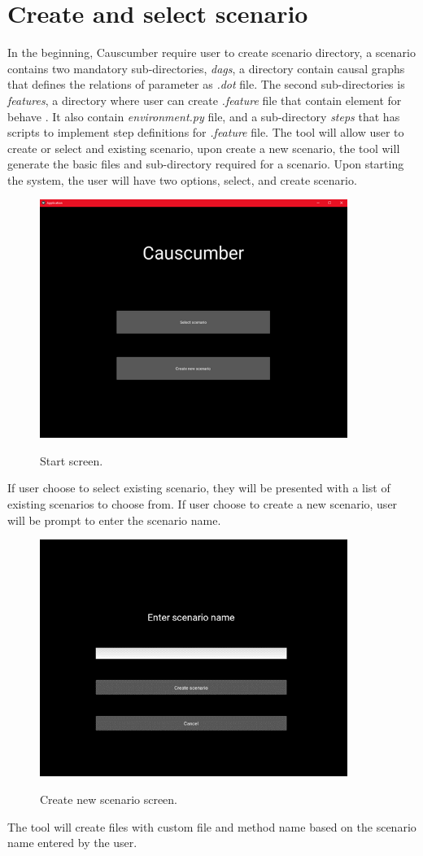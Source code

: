 \section{Create and select scenario}
In the beginning, Causcumber require user to create scenario directory, a scenario contains two mandatory sub-directories, \textsl{dags}, a directory contain causal graphs that defines the relations of parameter as \textsl{.dot} file. The second sub-directories is \textsl{features}, a directory where user can create \textsl{.feature} file that contain element for behave \cite{Reference21}. It also contain \textsl{environment.py} file, and a sub-directory \textsl{steps} that has scripts to implement step definitions for \textsl{.feature} file. The tool will allow user to create or select and existing scenario, upon create a new scenario, the tool will generate the basic files and sub-directory required for a scenario. Upon starting the system, the user will have two options, select, and create scenario.
\begin{figure}[H]
	\centering
	\includegraphics[width=10cm]{figures/startScreen.png}\\
	\caption{Start screen.}
	\label{fig:figure10}
\end{figure}
If user choose to select existing scenario, they will be presented with a list of existing scenarios to choose from. If user choose to create a new scenario, user will be prompt to enter the scenario name.
\begin{figure}[H]
	\centering
	\includegraphics[width=10cm]{figures/createNewScenario.png}\\
	\caption{Create new scenario screen.}
	\label{fig:figure11}
\end{figure}
The tool will create files with custom file and method name based on the scenario name entered by the user.

